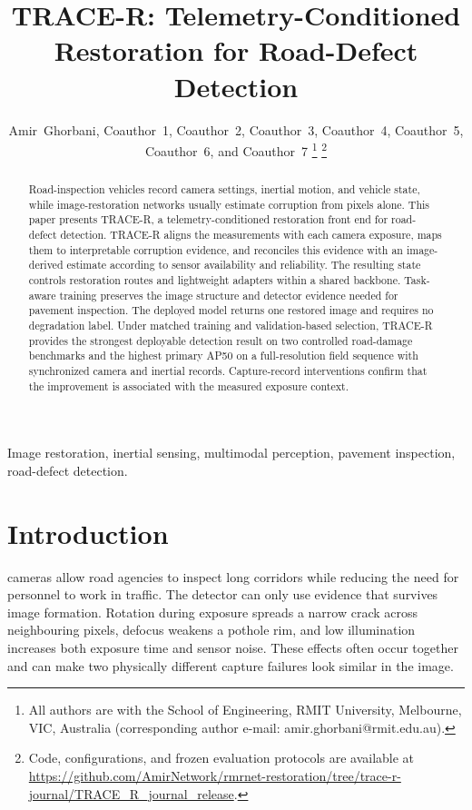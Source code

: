 \documentclass[journal]{IEEEtran}
\begin{document}
\title{TRACE-R: Telemetry-Conditioned Restoration for Road-Defect Detection}

\author{Amir~Ghorbani, Coauthor~1, Coauthor~2, Coauthor~3, Coauthor~4, Coauthor~5, Coauthor~6, and Coauthor~7%
\thanks{All authors are with the School of Engineering, RMIT University, Melbourne, VIC, Australia (corresponding author e-mail: amir.ghorbani@rmit.edu.au).}%
\thanks{Code, configurations, and frozen evaluation protocols are available at \url{https://github.com/AmirNetwork/rmrnet-restoration/tree/trace-r-journal/TRACE_R_journal_release}.}}

\maketitle

\begin{abstract}
Road-inspection vehicles record camera settings, inertial motion, and vehicle state, while image-restoration networks usually estimate corruption from pixels alone. This paper presents TRACE-R, a telemetry-conditioned restoration front end for road-defect detection. TRACE-R aligns the measurements with each camera exposure, maps them to interpretable corruption evidence, and reconciles this evidence with an image-derived estimate according to sensor availability and reliability. The resulting state controls restoration routes and lightweight adapters within a shared backbone. Task-aware training preserves the image structure and detector evidence needed for pavement inspection. The deployed model returns one restored image and requires no degradation label. Under matched training and validation-based selection, TRACE-R provides the strongest deployable detection result on two controlled road-damage benchmarks and the highest primary AP50 on a full-resolution field sequence with synchronized camera and inertial records. Capture-record interventions confirm that the improvement is associated with the measured exposure context.
\end{abstract}

\begin{IEEEkeywords}
Image restoration, inertial sensing, multimodal perception, pavement inspection, road-defect detection.
\end{IEEEkeywords}

\section{Introduction}
 cameras allow road agencies to inspect long corridors while reducing the need for personnel to work in traffic. The detector can only use evidence that survives image formation. Rotation during exposure spreads a narrow crack across neighbouring pixels, defocus weakens a pothole rim, and low illumination increases both exposure time and sensor noise. These effects often occur together and can make two physically different capture failures look similar in the image.
\end{document}
